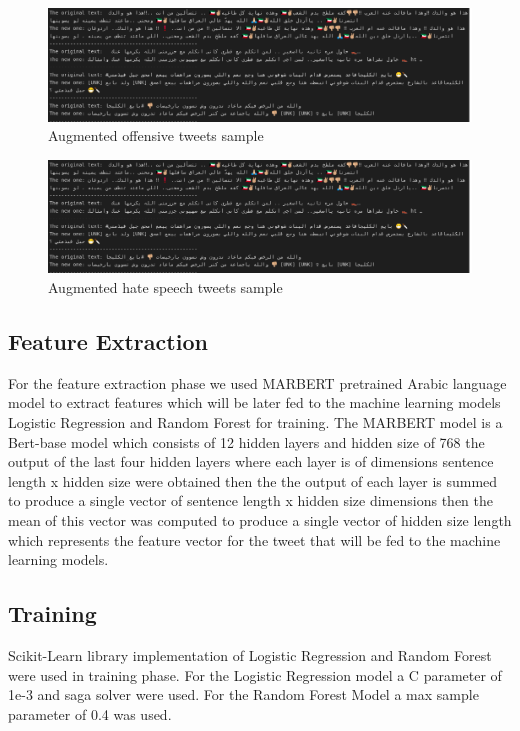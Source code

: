 \documentclass[conference]{IEEEtran}
\begin{document}
\begin{figure}[htbp]
	\includegraphics[width=\columnwidth, height=0.11\paperheight]{05.png}
	\caption{Augmented offensive tweets sample}
	\label{fig:aug_off_tweets}
\end{figure}

\begin{figure}[htbp]
	\includegraphics[width=\columnwidth, height=0.11\paperheight]{05.png}
	\caption{Augmented hate speech tweets sample}
	\label{fig:aug_hate_tweets}
\end{figure}

\subsection{Feature Extraction}
For the feature extraction phase we used MARBERT pretrained Arabic language model to extract features which will be later fed to the machine learning models Logistic Regression and Random Forest for training. The MARBERT model is a Bert-base model which consists of 12 hidden layers and hidden size of 768 the output of the last four hidden layers where each layer is of dimensions sentence length x hidden size were obtained then the the output of each layer is summed to produce a single vector of sentence length x hidden size dimensions then the mean of this vector was computed to produce a single vector of hidden size length which represents the feature vector for the tweet that will be fed to the machine learning models.

\subsection{Training}
Scikit-Learn library implementation of Logistic Regression and Random Forest were used in training phase. For the Logistic Regression model a C parameter of 1e-3 and saga solver were used. For the Random Forest Model a max sample parameter of 0.4 was used.
\end{document}
